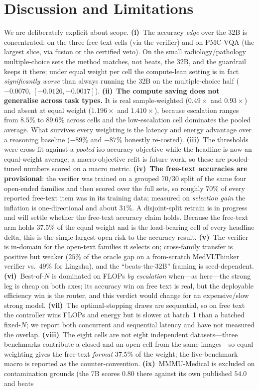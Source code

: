 \documentclass[conference]{IEEEtran}
\begin{document}
\section{Discussion and Limitations}
We are deliberately explicit about scope. \textbf{(i)}~The accuracy \emph{edge} over the 32B is concentrated: on the three free-text cells (via the verifier) and on PMC-VQA (the largest slice, via fusion or the certified veto). On the small radiology/pathology multiple-choice sets the method matches, not beats, the 32B, and the guardrail keeps it there; under equal weight per cell the compute-lean setting is in fact \emph{significantly worse} than always running the 32B on the multiple-choice half ($-0.0070$, $[-0.0126,-0.0017]$). \textbf{(ii)}~\textbf{The compute saving does not generalise across task types.} It is real sample-weighted ($0.49{\times}$ and $0.93{\times}$) and absent at equal weight ($1.196{\times}$ and $1.410{\times}$), because escalation ranges from $8.5\%$ to $89.6\%$ across cells and the low-escalation cell dominates the pooled average. What survives every weighting is the latency and energy advantage over a reasoning baseline ($-89\%$ and $-87\%$ honestly re-costed). \textbf{(iii)}~The thresholds were cross-fit against a \emph{pooled} iso-accuracy objective while the headline is now an equal-weight average; a macro-objective refit is future work, so these are pooled-tuned numbers scored on a macro metric. \textbf{(iv)}~\textbf{The free-text accuracies are provisional}: the verifier was trained on a grouped $70/30$ split of the same four open-ended families and then scored over the full sets, so roughly $70\%$ of every reported free-text item was in its training data; measured on \emph{selection gain} the inflation is one-directional and about $31\%$. A disjoint-split retrain is in progress and will settle whether the free-text accuracy claim holds. Because the free-text arm holds $37.5\%$ of the equal weight and is the load-bearing cell of every headline delta, this is the single largest open risk to the accuracy result. \textbf{(v)}~The verifier is in-domain for the open-text families it selects on; cross-family transfer is positive but weaker ($25\%$ of the oracle gap on a from-scratch MedVLThinker verifier vs.\ $49\%$ for Lingshu), and the ``beats-the-32B'' framing is seed-dependent. \textbf{(vi)}~Best-of-$N$ is dominated on FLOPs \emph{by escalation} when---as here---the strong leg is cheap on both axes; its accuracy win on free text is real, but the deployable efficiency win is the router, and this verdict would change for an expensive/slow strong model. \textbf{(vii)}~The optimal-stopping draws are sequential, so on free text the controller wins FLOPs and energy but is slower at batch~1 than a batched fixed-$N$; we report both concurrent and sequential latency and have not measured the overlap. \textbf{(viii)}~The eight cells are not eight independent datasets---three benchmarks contribute a closed and an open cell from the same images---so equal weighting gives the free-text \emph{format} $37.5\%$ of the weight; the five-benchmark macro is reported as the counter-convention. \textbf{(ix)}~MMMU-Medical is excluded on contamination grounds (the 7B scores $0.80$ there against its own published $54.0$ and beats 
\end{document}
